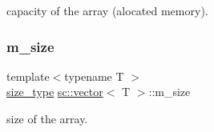 capacity of the array (alocated memory). 

\mbox{\label{classsc_1_1vector_a314ee71f4aec4b0507921d6f7e736aa3}} 
\subsubsection{\texorpdfstring{m\+\_\+size}{m\_size}}
{\footnotesize\ttfamily template$<$typename T $>$ \\
\hyperlink{classsc_1_1vector_aa4500ebad5be45f8d469fc4b5d62b19d}{size\+\_\+type} \hyperlink{classsc_1_1vector}{sc\+::vector}$<$ T $>$\+::m\+\_\+size\hspace{0.3cm}{\ttfamily [private]}}



size of the array. 

